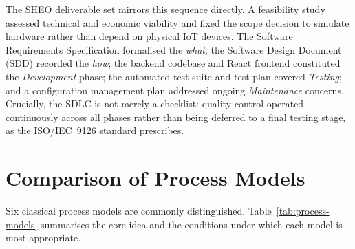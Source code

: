 The SHEO deliverable set mirrors this sequence directly. A feasibility study assessed
technical and economic viability and fixed the scope decision to simulate hardware rather
than depend on physical IoT devices. The Software Requirements Specification formalised
the \textit{what}; the Software Design Document (SDD) recorded the \textit{how}; the
backend codebase and React frontend constituted the \textit{Development} phase; the
automated test suite and test plan covered \textit{Testing}; and a configuration management
plan addressed ongoing \textit{Maintenance} concerns. Crucially, the SDLC is not merely a
checklist: quality control operated continuously across all phases rather than being
deferred to a final testing stage, as the ISO/IEC~9126 standard prescribes.

\section{Comparison of Process Models}
\label{sec:proc-models}

Six classical process models are commonly distinguished. Table~\ref{tab:process-models} summarises
the core idea and the conditions under which each model is most appropriate.

